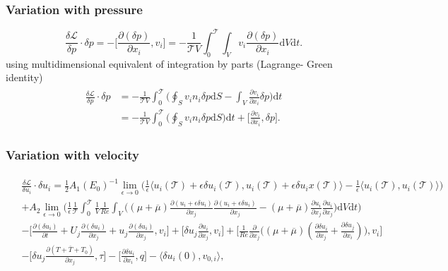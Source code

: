 \documentclass[preprint,12pt]{article}
\begin{document}
\subsubsection*{Variation with pressure}
\begin{equation}
\frac{\delta \mathcal{L}}{\delta p}\cdot \delta p=-\Big[\frac{\partial( \delta p)}{\partial x_i},v_i\Big]=-\frac{1}{\mathcal{T}V}\int_0^\mathcal{T}\int_Vv_i\frac{\partial( \delta p)}{\partial x_i} \text{d}V\text{d}t.
\end{equation}
using multidimensional equivalent of integration by parts (Lagrange- Green identity)
\begin{align}\begin{split}
\frac{\delta \mathcal{L}}{\delta p}\cdot \delta p&=-\frac{1}{\mathcal{T}V}\int_0^\mathcal{T}\Big(\oint_Sv_i  n_i\delta p\text{d}S-\int_V\frac{\partial v_i}{\partial x_i}\delta p\Big)\text{d}t\\&=-\frac{1}{\mathcal{T}V}\int_0^\mathcal{T}\Big(\oint_Sv_i  n_i\delta p\text{d}S\Big)\text{d}t+\Big[\frac{\partial v_i}{\partial x_i},\delta p\Big].
\end{split}\end{align}
\subsubsection*{Variation with velocity}
\begin{align}\begin{split}
&\frac{\delta \mathcal{L}}{\delta u_i}\cdot \delta u_i=\frac{1}{2}A_1(E_0)^{-1}\lim\limits_{\epsilon\rightarrow 0}\Big(\frac{1}{\epsilon}\Big\langle u_i(\mathcal{T})+\epsilon\delta u_i(\mathcal{T}),u_i(\mathcal{T})+\epsilon\delta u_ix(\mathcal{T}) \Big\rangle-\frac{1}{\epsilon}\Big\langle u_i(\mathcal{T}),u_i(\mathcal{T}) \Big\rangle\Big)\\&+A_2\lim\limits_{\epsilon\rightarrow 0}\Big(\frac{1}{\epsilon}\frac{1}{\mathcal{T}}\int_{0}^{\mathcal{T}}\frac{1}{V}\frac{1}{Re}\int_V\Bigg((\mu+\overline{\mu})\frac{\partial (u_{i}+\epsilon\delta u_i)}{\partial x_j}\frac{\partial (u_{i}+\epsilon\delta u_i)}{\partial x_j}-(\mu+\overline{\mu})\frac{\partial u_{i}}{\partial x_j}\frac{\partial u_{i}}{\partial x_j}\Bigg)\text{d}V\text{d}t\Big)\\&-\Bigg[\frac{\partial (\delta u_i)}{\partial t}+U_j\frac{\partial (\delta u_i)}{\partial x_j}+u_j\frac{\partial (\delta u_i)}{\partial x_j},v_i\Bigg]+\Bigg[\delta u_j\frac{\partial u_i}{\partial x_j},v_i\Bigg]+\Bigg[{\frac{1}{Re}}{\frac{\partial}{\partial x_j}}\Big(({\mu}+\overline{\mu})(\frac{\partial \delta u_i}{\partial x_j}+\frac{\partial \delta u_j}{\partial x_i})\Big),v_i\Bigg]\\&-\Bigg[\delta u_j\frac{\partial (T+\overline{T}+T_0)}{\partial x_j}, \tau\Bigg]-\Bigg[\frac{\partial \delta u_i}{\partial x_i},q\Bigg]-\langle \delta u_i(0),v_{0,i}\rangle,
\end{split}\end{align}
\end{document}
